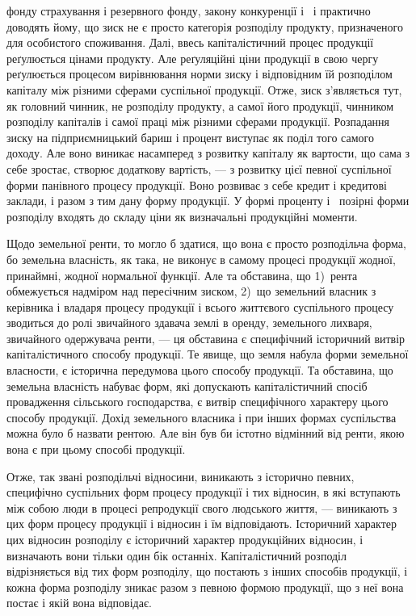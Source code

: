 \parcont{}  %
фонду страхування і резервного фонду, закону конкуренції і~ і практично
доводять йому, що зиск не є просто категорія розподілу продукту, призначеного
для особистого споживання. Далі, ввесь капіталістичний процес продукції реґулюється
цінами продукту. Але реґуляційні ціни продукції в свою чергу реґулюється
процесом вирівнювання норми зиску і відповідним їй розподілом капіталу
між різними сферами суспільної продукції. Отже, зиск з’являється тут, як головний
чинник, не розподілу продукту, а самої його продукції, чинником розподілу
капіталів і самої праці між різними сферами продукції. Розпадання зиску на
підприємницький бариш і процент виступає як поділ того самого доходу. Але воно
виникає насамперед з розвитку капіталу як вартости, що сама з себе зростає, створює
додаткову вартість, — з розвитку цієї певної суспільної форми панівного
процесу продукції. Воно розвиває з себе кредит і кредитові заклади, і разом з
тим дану форму продукції. У формі проценту і~ позірні форми розподілу
входять до складу ціни як визначальні продукційні моменти.

Щодо земельної ренти, то могло б здатися, що вона є просто розподільча
форма, бо земельна власність, як така, не виконує в самому процесі продукції
жодної, принаймні, жодної нормальної функції. Але та обставина, що 1)~рента
обмежується надміром над пересічним зиском, 2)~що земельний власник з керівника
і владаря процесу продукції і всього життєвого суспільного процесу зводиться
до ролі звичайного здавача землі в оренду, земельного лихваря, звичайного
одержувача ренти, — ця обставина є специфічний історичний витвір капіталістичного
способу продукції. Те явище, що земля набула форми земельної
власности, є історична передумова цього способу продукції. Та обставина, що
земельна власність набуває форм, які допускають капіталістичний спосіб провадження
сільського господарства, є витвір специфічного характеру цього способу
продукції. Дохід земельного власника і при інших формах суспільства
можна було б назвати рентою. Але він був би істотно відмінний від ренти,
якою вона є при цьому способі продукції.

Отже, так звані розподільчі відносини, виникають з історично певних,
специфічно суспільних форм процесу продукції і тих відносин, в які вступають
між собою люди в процесі репродукції свого людського життя, — виникають з цих
форм процесу продукції і відносин і їм відповідають. Історичний характер цих
відносин розподілу є історичний характер продукційних відносин, і визначають вони
тільки один бік останніх. Капіталістичний розподіл відрізняється від тих форм
розподілу, що постають з інших способів продукції, і кожна форма розподілу зникає
разом з певною формою продукції, що з неї вона постає і якій вона відповідає.

